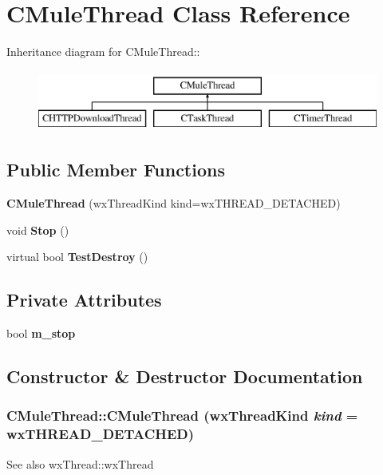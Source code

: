 \section{CMuleThread Class Reference}
\label{classCMuleThread}
Inheritance diagram for CMuleThread::\begin{figure}[H]
\begin{center}
\leavevmode
\includegraphics[height=2cm]{classCMuleThread}
\end{center}
\end{figure}
\subsection*{Public Member Functions}
\begin{DoxyCompactItemize}
\item 
{\bf CMuleThread} (wxThreadKind kind=wxTHREAD\_\-DETACHED)
\item 
void {\bf Stop} ()
\item 
virtual bool {\bf TestDestroy} ()\label{classCMuleThread_a08b5cc88313f658ef22bac2251504f88}

\end{DoxyCompactItemize}
\subsection*{Private Attributes}
\begin{DoxyCompactItemize}
\item 
bool {\bf m\_\-stop}\label{classCMuleThread_a804ffd824397346762d40b2b4e350eb9}

\end{DoxyCompactItemize}


\subsection{Constructor \& Destructor Documentation}
\subsubsection[{CMuleThread}]{\setlength{\rightskip}{0pt plus 5cm}CMuleThread::CMuleThread (wxThreadKind {\em kind} = {\ttfamily wxTHREAD\_\-DETACHED})\hspace{0.3cm}{\ttfamily  [inline]}}\label{classCMuleThread_a848d1afc4c0e926069ec00975b6c23e4}
\begin{DoxySeeAlso}{See also}
wxThread::wxThread 
\end{DoxySeeAlso}


